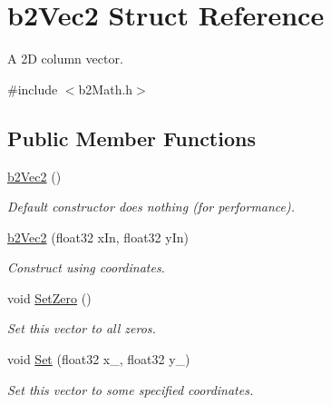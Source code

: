 \hypertarget{structb2_vec2}{}\section{b2\+Vec2 Struct Reference}
\label{structb2_vec2}


A 2D column vector.  




{\ttfamily \#include $<$b2\+Math.\+h$>$}

\subsection*{Public Member Functions}
\begin{DoxyCompactItemize}
\item 
\mbox{\label{structb2_vec2_a9171b31deb83af96872f99689939a12f}} 
\hyperlink{structb2_vec2_a9171b31deb83af96872f99689939a12f}{b2\+Vec2} ()
\begin{DoxyCompactList}\small\item\em Default constructor does nothing (for performance). \end{DoxyCompactList}\item 
\mbox{\label{structb2_vec2_a5d9a42aed33251a53c33a1ff7dd6be43}} 
\hyperlink{structb2_vec2_a5d9a42aed33251a53c33a1ff7dd6be43}{b2\+Vec2} (float32 x\+In, float32 y\+In)
\begin{DoxyCompactList}\small\item\em Construct using coordinates. \end{DoxyCompactList}\item 
\mbox{\label{structb2_vec2_a5c6cbe27cfb29c6dbb29b9a3285b88d0}} 
void \hyperlink{structb2_vec2_a5c6cbe27cfb29c6dbb29b9a3285b88d0}{Set\+Zero} ()
\begin{DoxyCompactList}\small\item\em Set this vector to all zeros. \end{DoxyCompactList}\item 
\mbox{\label{structb2_vec2_a4d61640a645e470a50b451307d8e94c3}} 
void \hyperlink{structb2_vec2_a4d61640a645e470a50b451307d8e94c3}{Set} (float32 x\+\_\+, float32 y\+\_\+)
\begin{DoxyCompactList}\small\item\em Set this vector to some specified coordinates. \end{DoxyCompactList}\item 

\end{DoxyCompactItemize}
